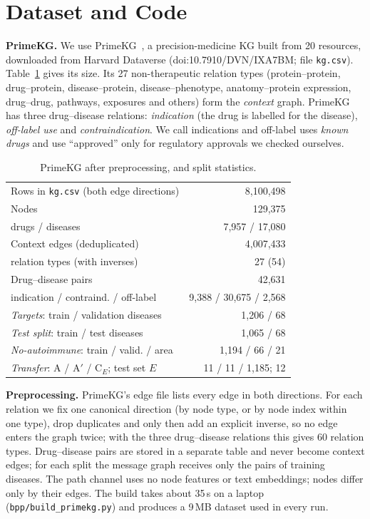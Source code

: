 \documentclass{ieeeaccess}
\begin{document}
\section{Dataset and Code}
\label{sec:data}
\textbf{PrimeKG.} We use PrimeKG~\cite{chandak2023primekg}, a precision-medicine KG built from 20 resources, downloaded from Harvard Dataverse (doi:10.7910/DVN/IXA7BM; file \texttt{kg.csv}). Table~\ref{tab:data} gives its size. Its 27 non-therapeutic relation types (protein--protein, drug--protein, disease--protein, disease--phenotype, anatomy--protein expression, drug--drug, pathways, exposures and others) form the \emph{context} graph. PrimeKG has three drug--disease relations: \emph{indication} (the drug is labelled for the disease), \emph{off-label use} and \emph{contraindication}. We call indications and off-label uses \emph{known drugs} and use ``approved'' only for regulatory approvals we checked ourselves.

\begin{table}[!t]
\centering
\caption{PrimeKG after preprocessing, and split statistics.}
\label{tab:data}
\small
\setlength{\tabcolsep}{4pt}
\begin{tabular*}{\columnwidth}{@{\extracolsep{\fill}}lr@{}}
\toprule
Rows in \texttt{kg.csv} (both edge directions) & 8,100,498 \\
Nodes & 129,375 \\
\quad drugs / diseases & 7,957 / 17,080 \\
Context edges (deduplicated) & 4,007,433 \\
\quad relation types (with inverses) & 27 (54) \\
Drug--disease pairs & 42,631 \\
\quad indication / contraind. / off-label & 9,388 / 30,675 / 2,568 \\
\midrule
\emph{Targets}: train / validation diseases & 1,206 / 68 \\
\emph{Test split}: train / test diseases & 1,065 / 68 \\
\emph{No-autoimmune}: train / valid. / area & 1,194 / 66 / 21 \\
\emph{Transfer}: A / A$'$ / C$_E$; test set $E$ & 11 / 11 / 1,185; 12 \\
\bottomrule
\end{tabular*}
\end{table}

\textbf{Preprocessing.} PrimeKG's edge file lists every edge in both directions. For each relation we fix one canonical direction (by node type, or by node index within one type), drop duplicates and only then add an explicit inverse, so no edge enters the graph twice; with the three drug--disease relations this gives 60 relation types. Drug--disease pairs are stored in a separate table and never become context edges; for each split the message graph receives only the pairs of training diseases. The path channel uses no node features or text embeddings; nodes differ only by their edges. The build takes about 35\,s on a laptop (\texttt{bpp/build\_primekg.py}) and produces a 9\,MB dataset used in every run.
\end{document}
